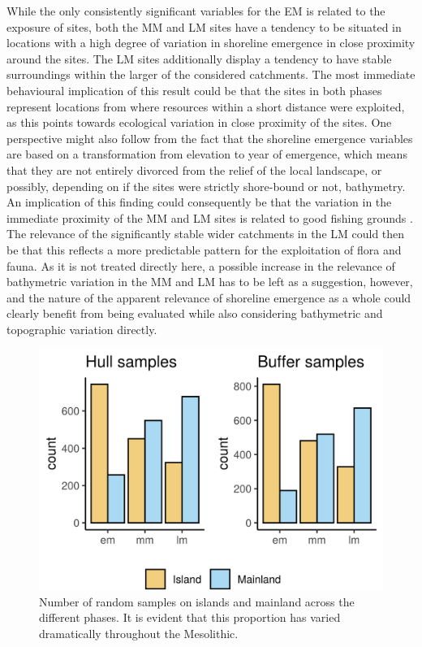 \documentclass[12pt, a4paper]{article}
\begin{document}
While the only consistently significant variables for the EM is related to the exposure of sites, both the MM and LM sites have a tendency to be situated in locations with a high degree of variation in shoreline emergence in close proximity around the sites. The LM sites additionally display a tendency to have stable surroundings within the larger of the considered catchments. The most immediate behavioural implication of this result could be that the sites in both phases represent locations from where resources within a short distance were exploited, as this points towards ecological variation in close proximity of the sites. One perspective might also follow from the fact that the shoreline emergence variables are based on a transformation from elevation to year of emergence, which means that they are not entirely divorced from the relief of the local landscape, or possibly, depending on if the sites were strictly shore-bound or not, bathymetry. An implication of this finding could consequently be that the variation in the immediate proximity of the MM and LM sites is related to good fishing grounds \citep[][]{darmark2018}. The relevance of the significantly stable wider catchments in the LM could then be that this reflects a more predictable pattern for the exploitation of ﬂora and fauna. As it is not treated directly here, a possible increase in the relevance of bathymetric variation in the MM and LM has to be left as a suggestion, however, and the nature of the apparent relevance of shoreline emergence as a whole could clearly benefit from being evaluated while also considering bathymetric and topographic variation directly. \par

\begin{figure}[ht]
	\centering
	\includegraphics[width = 0.75\linewidth]{island_hist.png}
	\caption[Island/mainland among samples]{Number of random samples on islands and mainland across the different phases. It is evident that this proportion has varied dramatically throughout the Mesolithic.}
	\label{fig:island_hist}
\end{figure}
\end{document}
